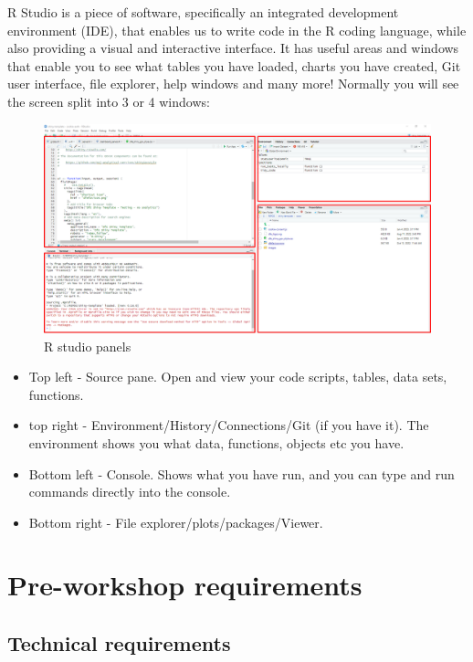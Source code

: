\documentclass[
  12pt,
]{article}
\begin{document}
R Studio is a piece of software, specifically an integrated development
environment (IDE), that enables us to write code in the R coding
language, while also providing a visual and interactive interface. It
has useful areas and windows that enable you to see what tables you have
loaded, charts you have created, Git user interface, file explorer, help
windows and many more! Normally you will see the screen split into 3 or
4 windows:

\begin{figure}
\includegraphics[width=1\linewidth]{images/RforRAP/R-studio-panels} \caption{R studio panels}\label{fig:unnamed-chunk-1}
\end{figure}

\begin{itemize}
\item
  Top left - Source pane. Open and view your code scripts, tables, data
  sets, functions.
\item
  top right - Environment/History/Connections/Git (if you have it). The
  environment shows you what data, functions, objects etc you have.
\item
  Bottom left - Console. Shows what you have run, and you can type and
  run commands directly into the console.
\item
  Bottom right - File explorer/plots/packages/Viewer.
\end{itemize}

\hypertarget{pre-workshop-requirements}{%
\section{Pre-workshop requirements}\label{pre-workshop-requirements}}

\hypertarget{technical-requirements}{%
\subsection{Technical requirements}\label{technical-requirements}}
\end{document}

